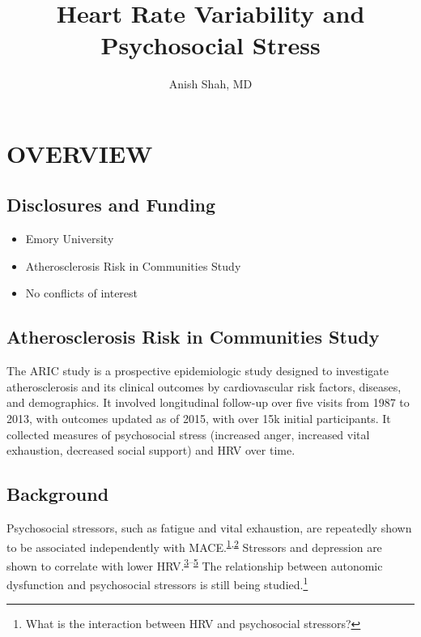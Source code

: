 \documentclass[10pt,]{tufte-handout}
\title{Heart Rate Variability and Psychosocial Stress}
\author{Anish Shah, MD}
\date{}
\providecommand{\tightlist}{%
  \setlength{\itemsep}{0pt}\setlength{\parskip}{0pt}}
\begin{document}
\maketitle




\hypertarget{overview}{%
\section{OVERVIEW}\label{overview}}

\hypertarget{disclosures-and-funding}{%
\subsection{Disclosures and Funding}\label{disclosures-and-funding}}

\begin{itemize}
\tightlist
\item
  Emory University
\item
  Atherosclerosis Risk in Communities Study
\item
  No conflicts of interest
\end{itemize}

\hypertarget{atherosclerosis-risk-in-communities-study}{%
\subsection{Atherosclerosis Risk in Communities
Study}\label{atherosclerosis-risk-in-communities-study}}

The ARIC study is a prospective epidemiologic study designed to
investigate atherosclerosis and its clinical outcomes by cardiovascular
risk factors, diseases, and demographics. It involved longitudinal
follow-up over five visits from 1987 to 2013, with outcomes updated as
of 2015, with over 15k initial participants. It collected measures of
psychosocial stress (increased anger, increased vital exhaustion,
decreased social support) and HRV over time.

\hypertarget{background}{%
\subsection{Background}\label{background}}

Psychosocial stressors, such as fatigue and vital exhaustion, are
repeatedly shown to be associated independently with
MACE.\textsuperscript{\protect\hyperlink{ref-Appels1988}{1},\protect\hyperlink{ref-Bogle2018}{2}}
Stressors and depression are shown to correlate with lower
HRV.\textsuperscript{\protect\hyperlink{ref-Huang2018}{3}--\protect\hyperlink{ref-Shah2013}{5}}
The relationship between autonomic dysfunction and psychosocial
stressors is still being studied.\footnote{What is the interaction
  between HRV and psychosocial stressors?}
\end{document}

